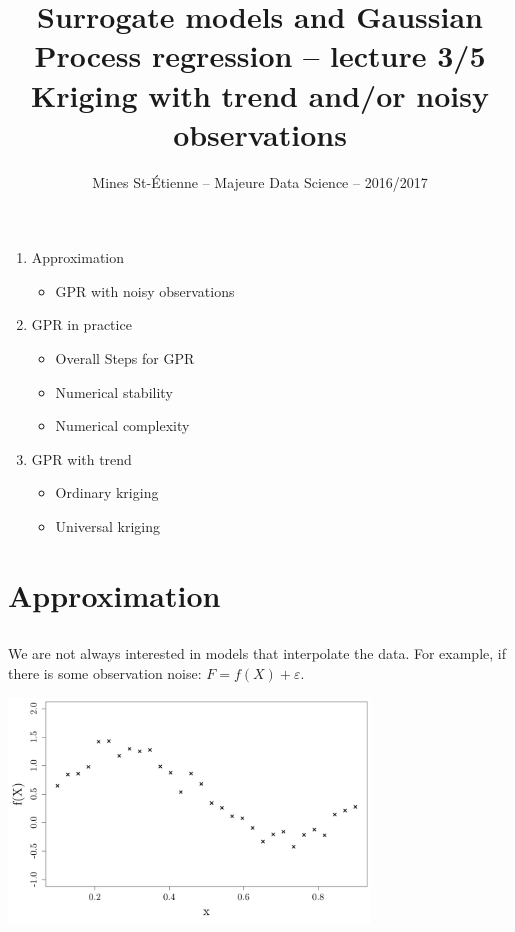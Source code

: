 \documentclass{beamer}
\title[Majeure Data Science -- Surrogate models and GPR]{\texorpdfstring{ \small Surrogate models and Gaussian Process regression -- lecture 3/5 \\ \vspace{3mm} \LARGE Kriging with trend and/or noisy observations}{}}
\author[Mines St-\'Etienne ]{Mines St-\'Etienne -- Majeure Data Science -- 2016/2017}
\institute{\texorpdfstring{Nicolas Durrande (durrande@emse.fr)}{}}
\date{\null}
\begin{document}
\begin{frame}
  \titlepage
\end{frame}

\begin{frame}{}
\vspace{0.75cm}
\vspace{0.5cm}
\begin{enumerate}
    \item Approximation
    \begin{itemize}
    	\item GPR with noisy observations  \vspace{2mm}
    \end{itemize}
    \item GPR in practice
        \begin{itemize}
    		\item Overall Steps for GPR
    		\item Numerical stability
    		\item Numerical complexity  \vspace{2mm}
    	\end{itemize}
    \item GPR with trend
    	\begin{itemize}
    		\item Ordinary kriging
    		\item Universal kriging
    	\end{itemize}
\end{enumerate}
\end{frame}


\section{Approximation}
\subsection{}

\begin{frame}{}
We are not always interested in models that interpolate the data. For example, if there is some observation noise: $F = f(X) + \varepsilon$.
\begin{center}
\includegraphics[height=6cm]{figures/R/noisyObs} 
\end{center}
\end{frame}
\end{document}
